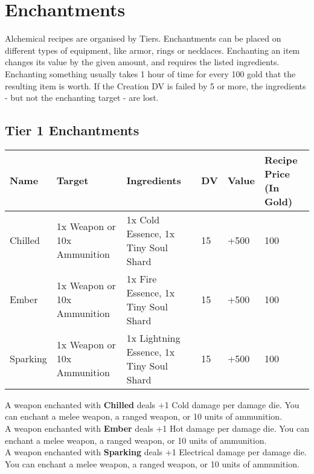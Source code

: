 \section{Enchantments}\label{sec:enchantments}
Alchemical recipes are organised by Tiers.
Enchantments can be placed on different types of equipment, like armor, rings or necklaces.
Enchanting an item changes its value by the given amount, and requires the listed ingredients.
Enchanting something usually takes 1 hour of time for every 100 gold that the resulting item is worth.
If the Creation DV is failed by 5 or more, the ingredients - but not the enchanting target - are lost.\\


\subsection{Tier 1 Enchantments}
\begin{longtable}{l | p{2.5cm} | p{2.5cm}| l | l | l }
	Name & Target & Ingredients & DV & Value & Recipe Price (In Gold)\\ \hline
	Chilled & 1x Weapon or 10x Ammunition & 1x Cold Essence, 1x Tiny Soul Shard & 15 & +500 & 100\\
	Ember & 1x Weapon or 10x Ammunition & 1x Fire Essence, 1x Tiny Soul Shard & 15 & +500 & 100\\
	Sparking & 1x Weapon or 10x Ammunition & 1x Lightning Essence, 1x Tiny Soul Shard & 15 & +500 & 100\\
\end{longtable}

A weapon enchanted with \textbf{Chilled} deals +1 Cold damage per damage die.
You can enchant a melee weapon, a ranged weapon, or 10 units of ammunition.\\

A weapon enchanted with \textbf{Ember} deals +1 Hot damage per damage die.
You can enchant a melee weapon, a ranged weapon, or 10 units of ammunition.\\

A weapon enchanted with \textbf{Sparking} deals +1 Electrical damage per damage die.
You can enchant a melee weapon, a ranged weapon, or 10 units of ammunition.\\
